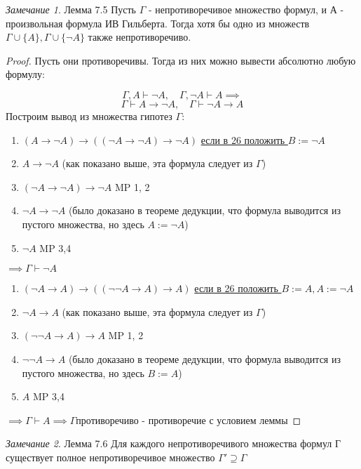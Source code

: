 \documentclass[a4paper]{article}
\theoremstyle{definition}
\theoremstyle{remark}
\newtheorem*{remark}{Замечание}
\begin{document}
    \begin{remark}
        Лемма 7.5 Пусть $\Gamma$ - непротиворечивое множество формул, и А - произвольная формула ИВ Гильберта.
        Тогда хотя бы одно из множеств $\Gamma \cup \{A\}, \Gamma \cup \{\neg A\}$ также непротиворечиво.
    \end{remark}
    \begin{proof}
        Пусть они противоречивы. Тогда из них можно вывести абсолютно любую формулу:

        $$\Gamma, A \vdash \neg A, \quad \Gamma, \neg A \vdash A \implies$$
        $$\Gamma \vdash A \to\neg A, \quad \Gamma \vdash \neg A \to A$$
        Построим вывод из множества гипотез $\Gamma:$
        \begin{enumerate}
            \item $(A\to \neg A)\to ((\neg A \to \neg A)\to \neg A)$ \hyperlink{Вывод 26}{если в 26 положить $B:=\neg A$}
            \item $A\to \neg A$ (как показано выше, эта формула следует из $\Gamma$)
            \item $(\neg A \to \neg A)\to \neg A$ MP 1, 2
            \item $\neg A \to \neg A$ (было доказано в теореме дедукции, что формула выводится из пустого множества, но здесь $A := \neg A$)
            \item $\neg A$ MP 3,4
        \end{enumerate}
        $\implies \Gamma \vdash \neg A$
        \begin{enumerate}
            \item $(\neg A\to A)\to ((\neg\neg A \to  A)\to A)$ \hyperlink{Вывод 26}{если в 26 положить $B:=A, A:= \neg A$}
            \item $\neg A\to A$ (как показано выше, эта формула следует из $\Gamma$)
            \item $(\neg \neg A \to  A)\to A$ MP 1, 2
            \item $\neg \neg A \to A$ (было доказано в теореме дедукции, что формула выводится из пустого множества, но здесь $B := A$)
            \item $A$ MP 3,4
        \end{enumerate}
        $\implies \Gamma \vdash A\implies\Gamma$противоречиво - противоречие с условием леммы
    \end{proof}
	\begin{remark}
		Лемма 7.6 Для каждого непротиворечивого множества формул Г существует полное непротиворечивое множество $\Gamma' \supseteq \Gamma$
	\end{remark}
\end{document}
